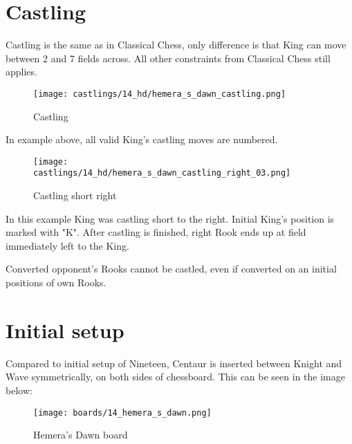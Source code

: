\clearpage %

\section*{Castling}

Castling is the same as in Classical Chess, only difference is that King can move between 2 and 7 fields across.
All other constraints from Classical Chess still applies.

\noindent
\begin{figure}[!h]
\texttt{[image: castlings/14\_hd/hemera\_s\_dawn\_castling.png]}
\caption{Castling}
\label{fig:hemera_s_dawn_castling}
\end{figure}

In example above, all valid King's castling moves are numbered.

\noindent
\begin{figure}[!h]
\texttt{[image: castlings/14\_hd/hemera\_s\_dawn\_castling\_right\_03.png]}
\caption{Castling short right}
\label{fig:hemera_s_dawn_castling_right_03}
\end{figure}

In this example King was castling short to the right. Initial King's position is marked with "K".
After castling is finished, right Rook ends up at field immediately left to the King.

Converted opponent's Rooks cannot be castled, even if converted on an initial positions
of own Rooks.

\clearpage %

\section*{Initial setup}

Compared to initial setup of Nineteen, Centaur is inserted between Knight and Wave
symmetrically, on both sides of chessboard. This can be seen in the image below:

\noindent
\begin{figure}[h]
\texttt{[image: boards/14\_hemera\_s\_dawn.png]}
\caption{Hemera's Dawn board}
\label{fig:14_hemera_s_dawn}
\end{figure}

\clearpage %
